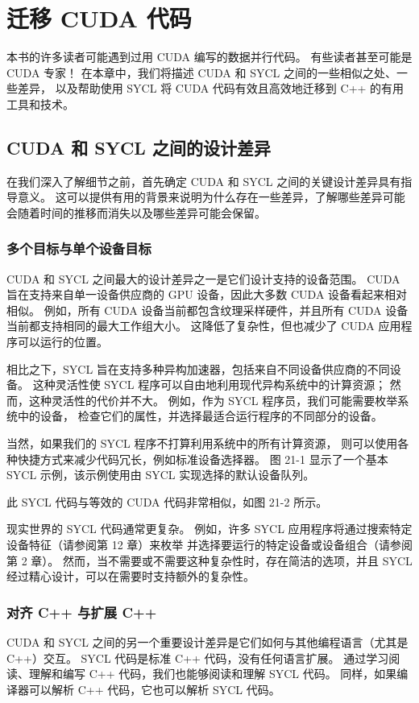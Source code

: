 \section{迁移 CUDA 代码}
本书的许多读者可能遇到过用 CUDA 编写的数据并行代码。 
有些读者甚至可能是 CUDA 专家！ 在本章中，我们将描述 CUDA 和 SYCL 之间的一些相似之处、一些差异，
以及帮助使用 SYCL 将 CUDA 代码有效且高效地迁移到 C++ 的有用工具和技术。

\subsection{CUDA 和 SYCL 之间的设计差异}
在我们深入了解细节之前，首先确定 CUDA 和 SYCL 之间的关键设计差异具有指导意义。 
这可以提供有用的背景来说明为什么存在一些差异，了解哪些差异可能会随着时间的推移而消失以及哪些差异可能会保留。

\subsubsection{多个目标与单个设备目标}
CUDA 和 SYCL 之间最大的设计差异之一是它们设计支持的设备范围。 
CUDA 旨在支持来自单一设备供应商的 GPU 设备，因此大多数 CUDA 设备看起来相对相似。 
例如，所有 CUDA 设备当前都包含纹理采样硬件，并且所有 CUDA 设备当前都支持相同的最大工作组大小。 
这降低了复杂性，但也减少了 CUDA 应用程序可以运行的位置。

相比之下，SYCL 旨在支持多种异构加速器，包括来自不同设备供应商的不同设备。 
这种灵活性使 SYCL 程序可以自由地利用现代异构系统中的计算资源； 
然而，这种灵活性的代价并不大。 例如，作为 SYCL 程序员，我们可能需要枚举系统中的设备，
检查它们的属性，并选择最适合运行程序的不同部分的设备。

当然，如果我们的 SYCL 程序不打算利用系统中的所有计算资源，
则可以使用各种快捷方式来减少代码冗长，例如标准设备选择器。 
图 21-1 显示了一个基本 SYCL 示例，该示例使用由 SYCL 实现选择的默认设备队列。

此 SYCL 代码与等效的 CUDA 代码非常相似，如图 21-2 所示。

现实世界的 SYCL 代码通常更复杂。 
例如，许多 SYCL 应用程序将通过搜索特定设备特征（请参阅第 12 章）来枚举
并选择要运行的特定设备或设备组合（请参阅第 2 章）。 
然而，当不需要或不需要这种复杂性时，存在简洁的选项，并且 SYCL 经过精心设计，可以在需要时支持额外的复杂性。

\subsubsection{对齐 C++ 与扩展 C++}
CUDA 和 SYCL 之间的另一个重要设计差异是它们如何与其他编程语言（尤其是 C++）交互。 
SYCL 代码是标准 C++ 代码，没有任何语言扩展。 
通过学习阅读、理解和编写 C++ 代码，我们也能够阅读和理解 SYCL 代码。 
同样，如果编译器可以解析 C++ 代码，它也可以解析 SYCL 代码。

